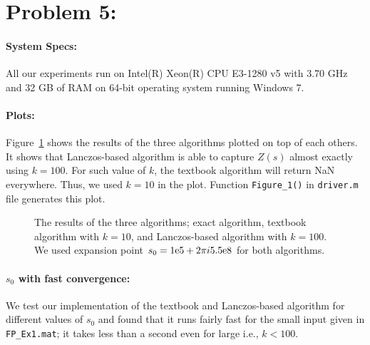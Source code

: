 \section*{Problem 5:}
\paragraph{System Specs:} All our experiments run on Intel(R) Xeon(R) CPU E3-1280 v5 with 3.70 GHz and 32 GB of RAM on 64-bit operating system running Windows 7. 

\paragraph{Plots:} Figure~\ref{fig:all} shows the results of the three algorithms plotted on top of each others. It shows that Lanczos-based algorithm is able to capture $Z(s)$ almost exactly using $k=100$. For such value of $k$, the textbook algorithm will return NaN everywhere. Thus, we used $k=10$ in the plot. Function \texttt{Figure\_1()} in \texttt{driver.m} file generates this plot. 

\begin{figure}[!tbh]
\centering        
   \caption{The results of the three algorithms; exact algorithm, textbook algorithm with $k=10$, and Lanczos-based algorithm with $k=100$. We used expansion point $s_{0} = {1}\mathrm{e}{5} + 2\pi i {5.5}\mathrm{e}{8}$ for both algorithms.   }
   \label{fig:all}
\end{figure}

\paragraph{$s_0$ with fast convergence:} We test our implementation of the textbook and Lanczos-based algorithm for different values of $s_{0}$ and found that it runs fairly fast for the small input given in \texttt{FP\_Ex1.mat}; it takes less than a second even for large i.e., $k < 100$. 

